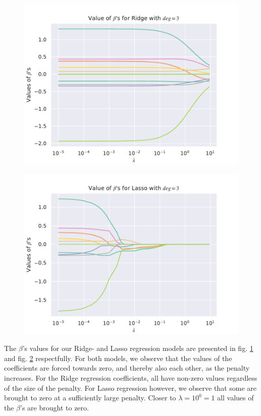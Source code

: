 \begin{figure}
    \centering
    \includegraphics[width=1\linewidth]{project_1_alt/figures/data/Ridge_Betas_lambda_Franke_Noise_const_deg.pdf}
    \caption{}
    \label{fig:ridge_betas}
\end{figure}

\begin{figure}
    \centering
    \includegraphics[width=1\linewidth]{project_1_alt/figures/data/Lasso_Betas_lambda_Franke_Noise_const_deg.pdf}
    \caption{}
    \label{fig:lasso_betas}
\end{figure}

The $\beta$'s values for our Ridge- and Lasso regression models are presented in fig. \ref{fig:ridge_betas} and fig. \ref{fig:lasso_betas} respectfully. For both models, we observe that the values of the coefficients are forced towards zero, and thereby also each other, as the penalty increases. For the Ridge regression coefficients, all have non-zero values regardless of the size of the penalty. For Lasso regression however, we observe that some are brought to zero at a sufficiently large penalty. Closer to $\lambda = 10^0 = 1$ all values of the $\beta$'s are brought to zero. 

